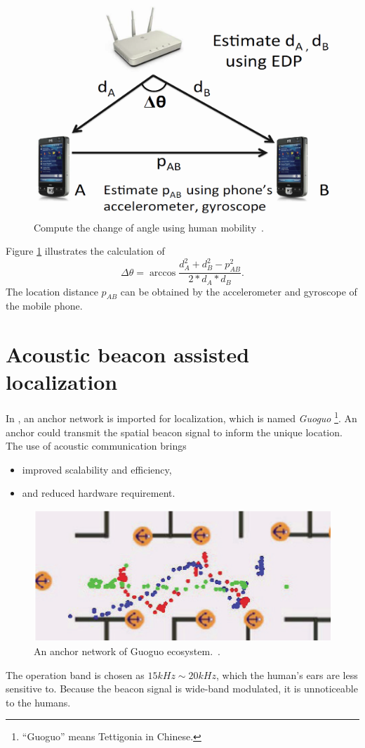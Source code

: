 \documentclass[letterpaper]{article}
\begin{document}
\begin{figure}
	\centering
	\includegraphics[width=0.7\linewidth]{fig/ANDP.png}
	\caption{Compute the change of angle using human mobility~\cite{Sen:2013:AMR:2462456.2464463}.}
	\label{fig:andp}
\end{figure}
Figure \ref{fig:andp} illustrates the calculation of
\begin{equation}
\Delta \theta = \arccos \frac{ d_{A}^{2}+d_{B}^{2}-p_{AB}^{2} }{ 2 * d_{A} * d_{B} }.
\end{equation}
The location distance $ p_{AB} $ can be obtained by the accelerometer and gyroscope of the mobile phone.

\section{Acoustic beacon assisted localization}

In \cite{Liu:2013:GEF:2462456.2464450}, an anchor network is imported for localization, which is named \emph{Guoguo}
\footnote{``Guoguo'' means Tettigonia in Chinese.}.
An anchor could transmit the spatial beacon signal to inform the unique location.
The use of acoustic communication brings
\begin{itemize}
	\item improved scalability and efficiency,
	\item and reduced hardware requirement.
\end{itemize}
\begin{figure}
	\centering
	\includegraphics[width=0.9\linewidth]{fig/GUOGUO.png}
	\caption{An anchor network of Guoguo ecosystem.~\cite{Liu:2013:GEF:2462456.2464450}.}
	\label{fig:guoguo}
\end{figure}
The operation band is chosen as $ 15 kHz \sim 20 kHz $, which the human's ears are less sensitive to.
Because the beacon signal is wide-band modulated, it is unnoticeable to the humans.
\end{document}

